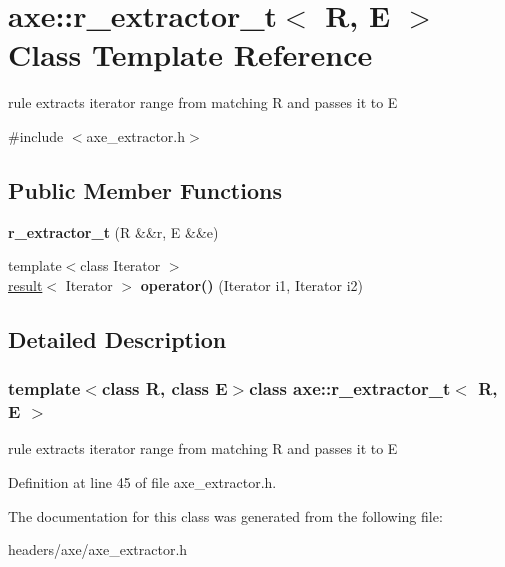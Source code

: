 \hypertarget{classaxe_1_1r__extractor__t}{\section{axe\+:\+:r\+\_\+extractor\+\_\+t$<$ R, E $>$ Class Template Reference}
\label{classaxe_1_1r__extractor__t}
}


rule extracts iterator range from matching R and passes it to E  




{\ttfamily \#include $<$axe\+\_\+extractor.\+h$>$}

\subsection*{Public Member Functions}
\begin{DoxyCompactItemize}
\item 
\hypertarget{classaxe_1_1r__extractor__t_a8ce2c8cb265ad00a549883c75cb36d69}{{\bfseries r\+\_\+extractor\+\_\+t} (R \&\&r, E \&\&e)}\label{classaxe_1_1r__extractor__t_a8ce2c8cb265ad00a549883c75cb36d69}

\item 
\hypertarget{classaxe_1_1r__extractor__t_afe9c42c52298c5b03dc00b676158f90f}{{\footnotesize template$<$class Iterator $>$ }\\\hyperlink{structaxe_1_1result}{result}$<$ Iterator $>$ {\bfseries operator()} (Iterator i1, Iterator i2)}\label{classaxe_1_1r__extractor__t_afe9c42c52298c5b03dc00b676158f90f}

\end{DoxyCompactItemize}


\subsection{Detailed Description}
\subsubsection*{template$<$class R, class E$>$class axe\+::r\+\_\+extractor\+\_\+t$<$ R, E $>$}

rule extracts iterator range from matching R and passes it to E 

Definition at line 45 of file axe\+\_\+extractor.\+h.



The documentation for this class was generated from the following file\+:\begin{DoxyCompactItemize}
\item 
headers/axe/axe\+\_\+extractor.\+h\end{DoxyCompactItemize}
